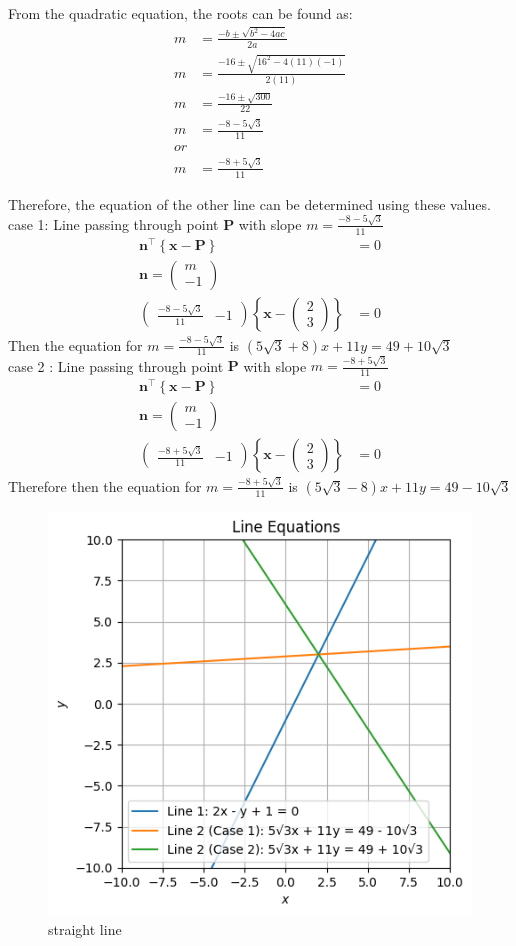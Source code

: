 \documentclass[10pt]{article}
\newcommand{\myvec}[1]{\ensuremath{\begin{pmatrix}#1\end{pmatrix}}}
\let\vec\mathbf
\providecommand{\cbrak}[1]{\ensuremath{\left\{#1\right\}}}
\let\vec\mathbf
\renewcommand{\vec}[1]{\textbf{#1}}
\begin{document}
From the quadratic equation, the roots can be found as:
\begin{align}
m &= \frac{-b \pm \sqrt{b^2 - 4ac}}{2a} \\
m &= \frac{-16 \pm \sqrt{16^2 - 4(11)(-1)}}{2(11)} \\
m &= \frac{-16 \pm \sqrt{300}}{22} \\
m &= \frac{-8 - 5\sqrt{3}}{11} \\
or\\ 
m &= \frac{-8 + 5\sqrt{3}}{11} 
\end{align}

Therefore, the equation of the other line can be determined using these values.
\\
case 1: Line passing through point $\vec{P}$ with slope $m=\frac{-8 - 5\sqrt{3}}{11}$
\begin{align}
    \vec{n}^\top\cbrak{{\vec{x}-\vec{P}}}&= 0 \\
    \vec{n} = \myvec{ m \\ -1 } \\
    \myvec{ \frac{-8 - 5\sqrt{3}}{11} & -1 }\cbrak{\vec{x}-\myvec{ 2 \\ 3 }} &= 0
\end{align}
Then the equation for $m=\frac{-8 - 5\sqrt{3}}{11}$ is \hspace{0.4cm}  $(5\sqrt{3}+8)x+11y=49+10\sqrt{3}$
\\
case 2 : Line passing through point $\vec{P}$ with slope $m =\frac{-8 + 5\sqrt{3}}{11}$
\begin{align}
     \vec{n}^\top\cbrak{{\vec{x}-\vec{P}}}&= 0 \\
    \vec{n} = \myvec{ m \\ -1 } \\
    \myvec{ \frac{-8 + 5\sqrt{3}}{11} & -1 }\cbrak{\vec{x}-\myvec{ 2 \\ 3 }} &= 0
\end{align}
Therefore then  the equation for $m=\frac{-8 + 5\sqrt{3}}{11}$  is \hspace{0.4cm}  $(5\sqrt{3}-8)x+11y=49-10\sqrt{3}$

\begin{figure}
    \centering
    \includegraphics[width=\columnwidth]{line.png}
    \caption{straight line}
    \label{fig:enter-label}
\end{figure}
\end{document}
